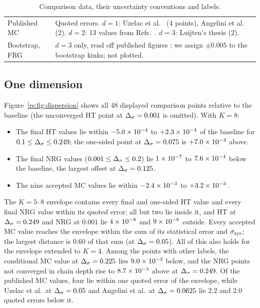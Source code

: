 \begin{table}[htbp]
\begin{tabular}{@{}>{\raggedright\arraybackslash}p{}>{\raggedright\arraybackslash}p{}@{}}
Published MC & Quoted errors. $d=1$: Uzelac et al.\ \cite{rs:Uzelac:2001lc} (4 points), Angelini et al.\ \cite{rs:Angelini:2014koy} (2). $d=2$: 13 values from Refs.~\cite{rs:Angelini:2014koy,rs:Luijten:1997th,rs:Picco:2012ak,rs:Xiao:2025sk}. $d=3$: Luijten's thesis \cite{rs:Luijten:1997th} (2).\\
Bootstrap, FRG & $d=3$ only, read off published figures \cite{rs:Behan:2023ile,rs:Defenu:2014bea}; we assign $\pm0.005$ to the bootstrap kinks; not plotted.\\
\bottomrule
\end{tabular}
\caption{Comparison data, their uncertainty conventions and labels.}
\label{rs:tab:refstatus}
\end{table}

\subsection{One dimension}\label{rs:sec:cmp1d}
Figure~\ref{rs:fig:dispersion} shows all 48 displayed comparison points relative to the
baseline (the unconverged HT point at $\Delta_\sigma=0.001$ is omitted). With $K=8$:
\begin{itemize}
\item The final HT values lie within $-5.0\times10^{-4}$ to $+2.3\times10^{-4}$ of the baseline
for $0.1\le\Delta_\sigma\le0.249$; the one-sided point at $\Delta_\sigma=0.075$ is $+7.0\times10^{-4}$ above.
\item The final NRG values ($0.001\le\Delta_\sigma\le0.2$) lie $1\times10^{-7}$ to $7.6\times10^{-4}$ below the
baseline, the largest offset at $\Delta_\sigma=0.125$.
\item The nine accepted MC values lie within $-2.4\times10^{-3}$ to $+3.2\times10^{-3}$.
\end{itemize}
The $K=5$--$8$ envelope contains every final and one-sided HT value and every final NRG value
within its quoted error; all but two lie inside it, and HT at $\Delta_\sigma=0.249$ and NRG at $0.001$
lie $4\times10^{-8}$ and $9\times10^{-8}$ outside. Every accepted MC value reaches the envelope
within the sum of its statistical error and $\sigma_{\rm sys}$; the largest distance is $0.60$
of that sum (at $\Delta_\sigma=0.05$). All of this also holds for the envelope extended to $K=4$. Among
the points with other labels, the conditional MC value at $\Delta_\sigma=0.225$ lies $9.0\times10^{-3}$
below, and the NRG points not converged in chain depth rise to $8.7\times10^{-3}$ above at
$\Delta_\sigma=0.249$. Of the published MC values, four lie within one quoted error of the envelope,
while Uzelac et al.\ at $\Delta_\sigma=0.05$ and Angelini et al.\ at $\Delta_\sigma=0.0625$ lie $2.2$ and $2.0$
quoted errors below it.

